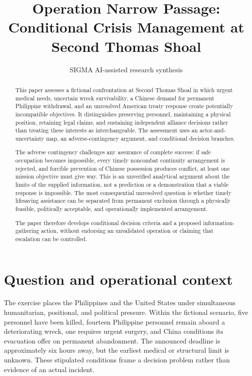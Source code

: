 \documentclass[11pt]{article}
\title{Operation Narrow Passage: Conditional Crisis Management at Second Thomas Shoal}
\date{}
\author{SIGMA AI-assisted research synthesis}
\begin{document}
\maketitle

\begin{abstract}
This paper assesses a fictional confrontation at Second Thomas Shoal in which urgent medical needs, uncertain wreck survivability, a Chinese demand for permanent Philippine withdrawal, and an unresolved American treaty response create potentially incompatible objectives. It distinguishes preserving personnel, maintaining a physical position, retaining legal claims, and sustaining independent alliance decisions rather than treating these interests as interchangeable. The assessment uses an actor-and-uncertainty map, an adverse-contingency argument, and conditional decision branches.

The adverse contingency challenges any assurance of complete success: if safe occupation becomes impossible, every timely noncombat continuity arrangement is rejected, and forcible prevention of Chinese possession produces conflict, at least one mission objective must give way. This is an unverified analytical argument about the limits of the supplied information, not a prediction or a demonstration that a viable response is impossible. The most consequential unresolved question is whether timely lifesaving assistance can be separated from permanent exclusion through a physically feasible, politically acceptable, and operationally implemented arrangement.

The paper therefore develops conditional decision criteria and a proposed information-gathering action, without endorsing an unvalidated operation or claiming that escalation can be controlled.
\end{abstract}
\section{Question and operational context}
The exercise places the Philippines and the United States under simultaneous humanitarian, positional, and political pressure. Within the fictional scenario, five personnel have been killed, fourteen Philippine personnel remain aboard a deteriorating wreck, one requires urgent surgery, and China conditions its evacuation offer on permanent abandonment. The announced deadline is approximately six hours away, but the earliest medical or structural limit is unknown. These stipulated conditions frame a decision problem rather than evidence of an actual incident.
\end{document}
